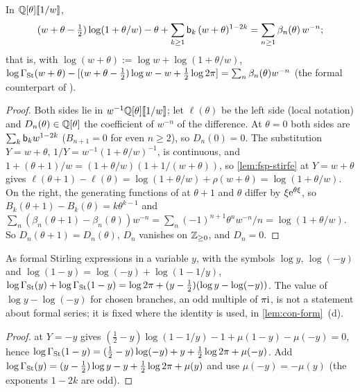 \begin{lem}
\label{lem:fsp-dlmf5118}
In $\mathbb{Q}[\theta][\![ 1/w ]\!]$,
\begin{equation}
\label{eq:fsp-5118}
(w+\theta-\tfrac12)\log(1+\theta/w)-\theta+\sum_{k\geq1}\mathsf{b}_k\,(w+\theta)^{1-2k}=\sum_{n\geq1}\beta_n(\theta)\,w^{-n};
\end{equation}
that is, with $\log(w+\theta):=\log w+\log(1+\theta/w)$, $\log\Gamma_{\mathrm{St}}(w+\theta)-[(w+\theta-\frac12)\log w-w+\frac12\log2\pi]=\sum_n\beta_n(\theta)w^{-n}$ (the formal counterpart of \cite[5.11.8]{DLMF}).
\end{lem}

\begin{proof}
Both sides lie in $w^{-1}\mathbb{Q}[\theta][\![ 1/w ]\!]$; let $\ell(\theta)$ be the left side (local notation) and $D_n(\theta)\in\mathbb{Q}[\theta]$ the coefficient of $w^{-n}$ of the difference. At $\theta=0$ both sides are $\sum_k\mathsf{b}_kw^{1-2k}$ ($B_{n+1}=0$ for even $n\geq2$), so $D_n(0)=0$. The substitution $Y=w+\theta$, $1/Y=w^{-1}(1+\theta/w)^{-1}$, is continuous, and $1+(\theta+1)/w=(1+\theta/w)(1+1/(w+\theta))$, so \cref{lem:fsp-stirfe} at $Y=w+\theta$ gives $\ell(\theta+1)-\ell(\theta)=\log(1+\theta/w)+\rho(w+\theta)=\log(1+\theta/w)$. On the right, the generating functions of \cite[24.2.3]{DLMF} at $\theta+1$ and $\theta$ differ by $\xi\mathrm{e}^{\theta\xi}$, so $B_k(\theta+1)-B_k(\theta)=k\theta^{k-1}$ \cite[24.4.1]{DLMF} and $\sum_n(\beta_n(\theta+1)-\beta_n(\theta))w^{-n}=\sum_n(-1)^{n+1}\theta^nw^{-n}/n=\log(1+\theta/w)$. So $D_n(\theta+1)=D_n(\theta)$, $D_n$ vanishes on $\mathbb{Z}_{\geq0}$, and $D_n=0$.
\end{proof}

\begin{lem}[Reflection]
\label{lem:fsp-refl}
As formal Stirling expressions in a variable $y$, with the symbols $\log y$, $\log(-y)$ and $\log(1-y)=\log(-y)+\log(1-1/y)$,
$\log\Gamma_{\mathrm{St}}(y)+\log\Gamma_{\mathrm{St}}(1-y)=\log2\pi+(y-\frac12)(\log y-\log(-y))$. The value of $\log y-\log(-y)$ for chosen branches, an odd multiple of $\pi\mathrm{i}$, is not a statement about formal series; it is fixed where the identity is used, in \cref{lem:con-form}~(d).
\end{lem}

\begin{proof}
 at $Y=-y$ gives $(\frac12-y)\log(1-1/y)-1+\mu(1-y)-\mu(-y)=0$, hence $\log\Gamma_{\mathrm{St}}(1-y)=(\frac12-y)\log(-y)+y+\frac12\log2\pi+\mu(-y)$. Add $\log\Gamma_{\mathrm{St}}(y)=(y-\frac12)\log y-y+\frac12\log2\pi+\mu(y)$ and use $\mu(-y)=-\mu(y)$ (the exponents $1-2k$ are odd).
\end{proof}

